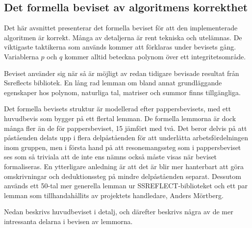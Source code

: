 \subsection{Det formella beviset av algoritmens korrekthet}
Det här avsnittet presenterar det formella beviset för att den implementerade
algoritmen är korrekt. Många av detaljerna är rent tekniska och utelämnas. De
viktigaste taktikerna som används kommer att förklaras under bevisets gång.
Variablerna $p$ och $q$ kommer alltid beteckna polynom över ett
integritetsområde.

Beviset använder sig när så är möjligt av redan tidigare bevisade resultat från
Ssreflects bibliotek. En lång rad lemman om bland annat grundläggande
egenskaper hos polynom, naturliga tal, matriser och summor finns tillgängliga.

Det formella bevisets struktur är modellerad efter pappersbevisets, med ett
huvudbevis som bygger på ett flertal lemman. De formella lemmorna är dock många
fler än de för pappersbeviset, 15 jämfört med två. Det beror delvis på att
påståenden delats upp i flera delpåståenden för att underlätta
arbetsfördelningen inom gruppen, men i första hand på att resonemangssteg som i
pappersbeviset ses som så triviala att de inte ens nämns också måste visas när
beviset formaliseras. En ytterligare anledning är att det är blir mer
hanterbart att göra omskrivningar och deduktionssteg på mindre delpåståenden
separat. Dessutom används ett 50-tal mer generella lemman ur
SSREFLECT-biblioteket och ett par lemman som tillhandahållits av projektets
handledare, Anders Mörtberg.

Nedan beskrivs huvudbeviset i detalj, och därefter beskrivs några av de mer
intressanta delarna i bevisen av lemmorna.

